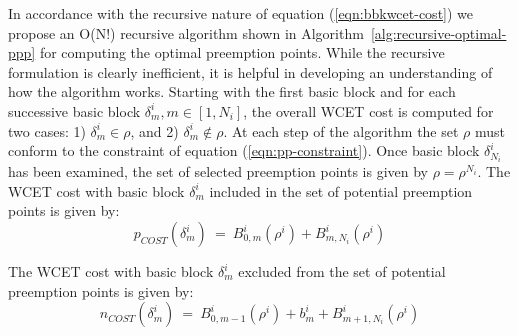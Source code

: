 \noindent
In accordance with the recursive nature of equation (\ref{eqn:bbkwcet-cost}) we propose an O(N!) recursive algorithm shown in Algorithm~\ref{alg:recursive-optimal-ppp} for computing the optimal preemption points.  While the recursive formulation is clearly inefficient, it is helpful in developing an understanding of how the algorithm works.  Starting with the first basic block and for each successive basic block \begin{math}\delta_{m}^{i}, m \in [1,N_{i}]\end{math}, the overall WCET cost is computed for two cases: 1) \begin{math}\delta_{m}^{i} \in \rho\end{math}, and 2) \begin{math}\delta_{m}^{i} \not\in \rho\end{math}.  At each step of the algorithm the set \begin{math}\rho\end{math} must conform to the constraint of equation (\ref{eqn:pp-constraint}).  Once basic block \begin{math}\delta_{N_{i}}^{i}\end{math} has been examined, the set of selected preemption points is given by \begin{math}\rho = \rho^{N_{i}}\end{math}.  The WCET cost with basic block \begin{math}\delta_{m}^{i}\end{math} included in the set of potential preemption points is given by:
\begin{equation}\label{eqn:pcost-bb}
p_{COST}(\delta_{m}^{i})\ =\ B_{0,m}^{i}(\rho^{i}) + B_{m,N_{i}}^{i}(\rho^{i})
\end{equation}

The WCET cost with basic block \begin{math}\delta_{m}^{i}\end{math} excluded from the set of potential preemption points is given by:
\begin{equation}\label{eqn:npcost-bb}
n_{COST}(\delta_{m}^{i})\ =\ B_{0,m-1}^{i}(\rho^{i}) + b_{m}^{i} + B_{m+1,N_{i}}^{i}(\rho^{i})
\end{equation}

